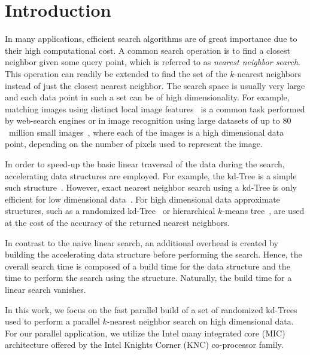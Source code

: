 \section{Introduction}
  \label{sec:intro}


   In many applications, efficient search algorithms are of 
  great importance due to their high computational cost.  A common search 
  operation is to find a closest neighbor given some query point, which is 
  referred to as \emph{nearest neighbor search}.  This operation can readily be 
  extended to find the set of the $k$-nearest neighbors instead of just the 
  closest nearest neighbor.  The search space is usually very large and each 
  data point in such a set can be of high dimensionality.  For example, 
  matching images using distinct local image features~\cite{lowe2004a} is 
  a common task performed by web-search engines or in image recognition using 
  large datasets of up to $80$~million small images~\cite{torralba2008a}, where 
  each of the images is a high dimensional data point, depending on the number 
  of pixels used to represent the image.

  In order to speed-up the basic linear traversal of the data during the 
  search, accelerating data structures are employed.  For example, the kd-Tree 
  is a simple such structure~\cite{bentley1975a,friedman1977a}.  However, exact 
  nearest neighbor search using a kd-Tree is only efficient for low dimensional 
  data~\cite{muja2009a}.  For high dimensional data approximate structures, 
  such as a randomized kd-Tree~\cite{silpa2008a} or hierarchical $k$-means 
  tree~\cite{muja2009a}, are used at the cost of the accuracy of the returned 
  nearest neighbors.

  In contrast to the naive linear search, an additional overhead is created by 
  building the accelerating data structure before performing the search.  
  Hence, the overall search time is composed of a build time for the data 
  structure and the time to perform the search using the structure.  Naturally, 
  the build time for a linear search vanishes.

  In this work, we focus on the fast parallel build of a set of randomized 
  kd-Trees used to perform a parallel $k$-nearest neighbor search on high 
  dimensional data.  For our parallel application, we utilize the Intel many 
  integrated core (MIC) architecture offered by the Intel Knights Corner (KNC) 
  co-processor family.

